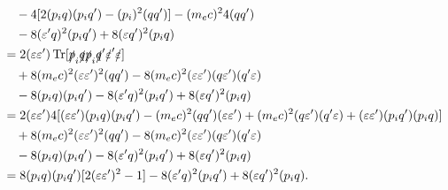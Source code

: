 \begin{align*}
  & \quad -4[2(p_iq)(p_iq')-(p_i)^2(qq')] - (m_ec)^24(qq')\\
  & \quad -8(\varepsilon'q)^2(p_iq') + 8(\varepsilon q')^2(p_iq)\\
  & = 2(\varepsilon\varepsilon')\operatorname{Tr} [\slashed{p}_i\slashed{q}\slashed{p}_i\slashed{q}'\slashed{\varepsilon}'\slashed{\varepsilon}]\\
  & \quad +8(m_ec)^2(\varepsilon\varepsilon')^2(qq') - 8(m_ec)^2(\varepsilon\varepsilon')(q\varepsilon')(q'\varepsilon)\\
  & \quad -8(p_iq)(p_iq') - 8(\varepsilon'q)^2(p_iq') + 8(\varepsilon q')^2(p_iq)\\
  & = 2(\varepsilon\varepsilon')4[(\varepsilon\varepsilon')(p_iq)(p_iq')-(m_ec)^2(qq')(\varepsilon\varepsilon')+(m_ec)^2(q\varepsilon')(q'\varepsilon)+(\varepsilon\varepsilon')(p_iq')(p_iq)]\\
  & \quad +8(m_ec)^2(\varepsilon\varepsilon')^2(qq') - 8(m_ec)^2(\varepsilon\varepsilon')(q\varepsilon')(q'\varepsilon)\\
  & \quad -8(p_iq)(p_iq') - 8(\varepsilon'q)^2(p_iq') + 8(\varepsilon q')^2(p_iq)\\
  & = 8(p_iq)(p_iq')[2(\varepsilon\varepsilon')^2-1] - 8(\varepsilon'q)^2(p_iq') + 8(\varepsilon q')^2(p_iq).
\end{align*}

